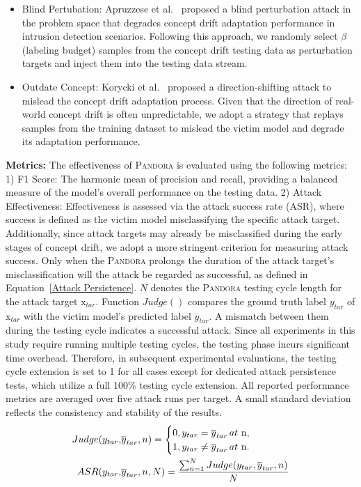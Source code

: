 \documentclass[lettersize,journal]{IEEEtran}
\newcommand{\pandora}{{\scshape Pandora}\xspace}
\begin{document}
\begin{itemize}[leftmargin=0.35cm]
	\item Blind Pertubation: Apruzzese et al.~\cite{apruzzese2024adversarial} proposed a blind perturbation attack in the problem space that degrades concept drift adaptation performance in intrusion detection scenarios.
	Following this approach, we randomly select $\beta$ (labeling budget) samples from the concept drift testing data as perturbation targets and inject them into the testing data stream.
	\item Outdate Concept: Korycki et al.~\cite{2023-CCF-B-Adversarial-concept-drift-detection-under-poisoning-attacks} proposed a direction-shifting attack to mislead the concept drift adaptation process.
	Given that the direction of real-world concept drift is often unpredictable, we adopt a strategy that replays samples from the training dataset to mislead the victim model and degrade its adaptation performance.
\end{itemize}

\textbf{Metrics:} 
The effectiveness of \pandora is evaluated using the following metrics:
1) F1 Score: The harmonic mean of precision and recall, providing a balanced measure of the model’s overall performance on the testing data.
2) Attack Effectiveness: Effectiveness is assessed via the attack success rate (ASR), where success is defined as the victim model misclassifying the specific attack target.
Additionally, since attack targets may already be misclassified during the early stages of concept drift, we adopt a more stringent criterion for measuring attack success.
Only when the \pandora prolongs the duration of the attack target’s misclassification will the attack be regarded as successful, as defined in Equation~\ref{Attack Persistence}.
$N$ denotes the \pandora testing cycle length for the attack target $\bm{\mathrm{x}}_{tar}$. 
Function $Judge()$ compares the ground truth label $y_{tar}$ of $\bm{\mathrm{x}}_{tar}$ with the victim model’s predicted label $\overline{y}_{tar}$. 
A mismatch between them during the testing cycle indicates a successful attack.
Since all experiments in this study require running multiple testing cycles, the testing phase incurs significant time overhead.
Therefore, in subsequent experimental evaluations, the testing cycle extension is set to 1 for all cases except for dedicated attack persistence tests, which utilize a full 100\% testing cycle extension.
All reported performance metrics are averaged over five attack runs per target.
A small standard deviation reflects the consistency and stability of the results.
\begin{align}
	Judge(y_{tar}, & \overline{y}_{tar},n) =
	\begin{cases} 
		0,y_{tar}=\overline{y}_{tar} \, at \,\, $n$, \\
		1,y_{tar} \neq \overline{y}_{tar} \, at \,\, $n$.
	\end{cases}  \\
	ASR(y_{tar},& \overline{y}_{tar},n,N)  = \frac {\sum_{n=1}^{N}Judge(y_{tar}, \overline{y}_{tar},n)}{N}
	\label{Attack Persistence}
\end{align}
\end{document}
